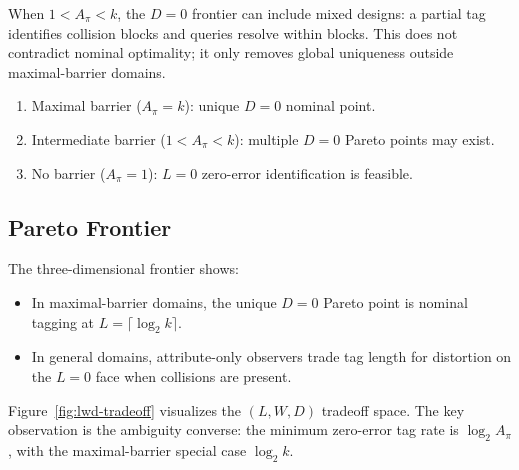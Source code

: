 \begin{remark}[General $D=0$ Frontier]
When $1 < A_\pi < k$, the $D=0$ frontier can include mixed designs: a partial tag identifies collision blocks and queries resolve within blocks. This does not contradict nominal optimality; it only removes global uniqueness outside maximal-barrier domains.
\begin{enumerate}
\item Maximal barrier ($A_\pi=k$): unique $D=0$ nominal point.
\item Intermediate barrier ($1<A_\pi<k$): multiple $D=0$ Pareto points may exist.
\item No barrier ($A_\pi=1$): $L=0$ zero-error identification is feasible.
\end{enumerate}
\end{remark}

\subsection{Pareto Frontier}

The three-dimensional frontier shows:
\begin{itemize}
\item In maximal-barrier domains, the unique $D=0$ Pareto point is nominal tagging at $L=\lceil \log_2 k\rceil$.
\item In general domains, attribute-only observers trade tag length for distortion on the $L=0$ face when collisions are present.
\end{itemize}

Figure~\ref{fig:lwd-tradeoff} visualizes the $(L, W, D)$ tradeoff space. The key observation is the ambiguity converse: the minimum zero-error tag rate is $\log_2 A_\pi$, with the maximal-barrier special case $\log_2 k$.

